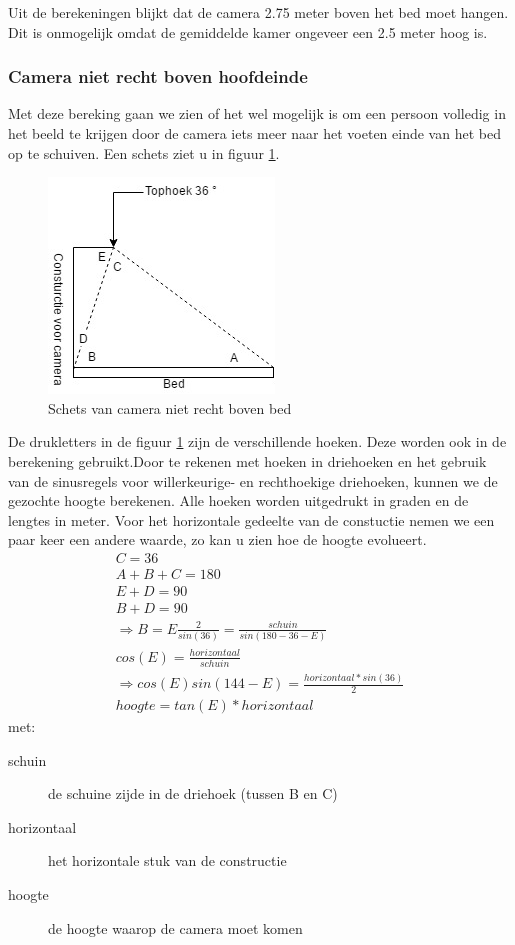 Uit de berekeningen blijkt dat de camera 2.75 meter boven het bed moet hangen. Dit is onmogelijk omdat de gemiddelde kamer ongeveer een 2.5 meter hoog is.

\subsubsection{Camera niet recht boven hoofdeinde}
Met deze bereking gaan we zien of het wel mogelijk is om een persoon volledig in het beeld te krijgen door de camera iets meer naar het voeten einde van het bed op te schuiven. Een schets ziet u in figuur \ref{imgCNRBB}.
\begin{figure}[h]
	\includegraphics[scale=0.75]{CameraNietRechtBoven}
	\caption{Schets van camera niet recht boven bed}
	\label{imgCNRBB}
\end{figure}
De drukletters in de figuur \ref{imgCNRBB} zijn de verschillende hoeken. Deze worden ook in de berekening gebruikt.Door te rekenen met hoeken in driehoeken en het gebruik van de sinusregels voor willerkeurige- en rechthoekige driehoeken, kunnen we de gezochte hoogte berekenen. Alle hoeken worden uitgedrukt in graden en de lengtes in meter. Voor het horizontale gedeelte van de constuctie nemen we een paar keer een andere waarde, zo kan u zien hoe de hoogte evolueert.
\begin{gather}
	C=36\\
	A+B+C=180 \\
	E+D=90 \\
	B+D=90 \\
	\Rightarrow B=E
	\frac{2}{sin(36)}=\frac{schuin}{sin(180-36-E)}\\
	cos(E)=\frac{horizontaal}{schuin}\\
	\Rightarrow cos(E)sin(144-E)=\frac{horizontaal*sin(36)}{2}\\
	hoogte=tan(E)*horizontaal
\end{gather}
met:
\begin{description}
	\item[schuin] de schuine zijde in de driehoek (tussen B en C)
	\item[horizontaal] het horizontale stuk van de constructie
	\item[hoogte] de hoogte waarop de camera moet komen
\end{description}
